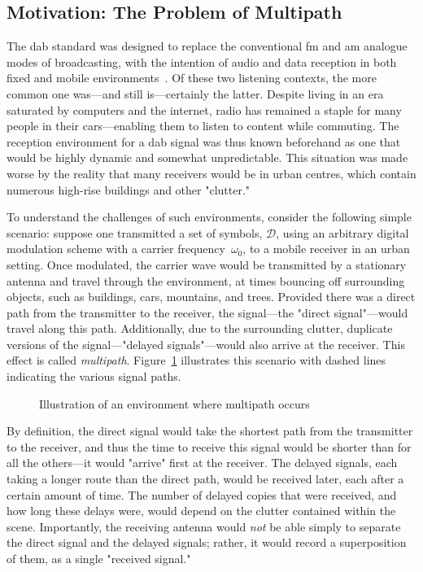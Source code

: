 \documentclass[class=report,11pt,crop=false]{standalone}
\begin{document}
\subsection{Motivation: The Problem of Multipath \label{subsect:multipath}}

The \gls{dab} standard was designed to replace the conventional \gls{fm} and \gls{am} analogue modes of broadcasting, with the intention of audio and data reception in both fixed and mobile environments~\cite{dabstandard}. Of these two listening contexts, the more common one was---and still is---certainly the latter. Despite living in an era saturated by computers and the internet, radio has remained a staple for many people in their cars---enabling them to listen to content while commuting. The reception environment for a \gls{dab} signal was thus known beforehand as one that would be highly dynamic and somewhat unpredictable. This situation was made worse by the reality that many receivers would be in urban centres, which contain numerous high-rise buildings and other "clutter."

To understand the challenges of such environments, consider the following simple scenario: suppose one transmitted a set of symbols, \(\mathcal{D}\), using an arbitrary digital modulation scheme with a carrier frequency~\(\omega_0\), to a mobile receiver in an urban setting. Once modulated, the carrier wave would be transmitted by a stationary antenna and travel through the environment, at times bouncing off surrounding objects, such as buildings, cars, mountains, and trees. Provided there was a direct path from the transmitter to the receiver, the signal---the "direct signal"---would travel along this path. Additionally, due to the surrounding clutter, duplicate versions of the signal---"delayed signals"---would also arrive at the receiver. This effect is called \emph{multipath}. Figure~\ref{fig:multipath-illustration} illustrates this scenario with dashed lines indicating the various signal paths.
\begin{figure}[htbp]
    \centering
    \captionsetup{type=figure}
    \def\svgwidth{0.8\linewidth}
    { %
    \scriptsize
        }
    \caption{Illustration of an environment where multipath occurs}
    \label{fig:multipath-illustration}
\end{figure}

By definition, the direct signal would take the shortest path from the transmitter to the receiver, and thus the time to receive this signal would be shorter than for all the others---it would "arrive" first at the receiver. The delayed signals, each taking a longer route than the direct path, would be received later, each after a certain amount of time. The number of delayed copies that were received, and how long these delays were, would depend on the clutter contained within the scene. Importantly, the receiving antenna would \emph{not} be able simply to separate the direct signal and the delayed signals; rather, it would record a superposition of them, as a single "received signal."
\end{document}
